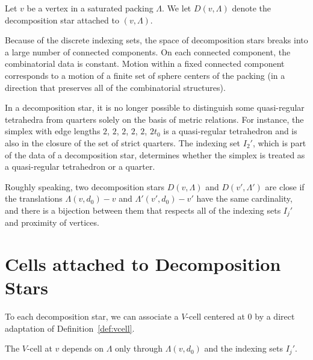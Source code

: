 \begin{definition}\label{def:dstar-at-v}  Let $v$ be a vertex in a
saturated packing $\Lambda$.   We let $D(v,\Lambda)$ denote the
decomposition star attached to $(v,\Lambda)$.
%
\end{definition}

Because of the discrete indexing sets, the space of decomposition
stars breaks into a large number of connected components.  On each
connected component, the combinatorial data is constant.  Motion
within a fixed connected component corresponds to a motion of a
finite set of sphere centers of the packing (in a direction that
preserves all of the combinatorial structures).

In a decomposition star, it is no longer possible to distinguish
some quasi-regular tetrahedra from quarters solely on the basis of
metric relations.  For instance, the simplex with edge lengths
$2$, $2$, $2$, $2$, $2$, $2t_0$ is a quasi-regular tetrahedron and
is also in the closure of the set of strict quarters.  The
indexing set $I_2'$, which is part of the data of a decomposition
star, determines whether the simplex is treated as a quasi-regular
tetrahedron or a quarter.

Roughly speaking, two decomposition stars $D(v,\Lambda)$ and
$D(v',\Lambda')$ are close if the translations
   $\Lambda(v,d_0)-v$ and $\Lambda'(v',d_0)-v'$ have the same
   cardinality, and there is a bijection between them that
   respects all of the indexing sets $I_j'$ and proximity of
   vertices.

\section{Cells attached to Decomposition Stars}\label{sec:cell-ds}

To each decomposition star, we can associate a $V$-cell centered
at $0$ by a direct adaptation of Definition~\ref{def:vcell}.

\begin{lemma}  The $V$-cell at $v$ depends on $\Lambda$ only
through $\Lambda(v,d_0)$ and the indexing sets
$I_j'$.
\end{lemma}

